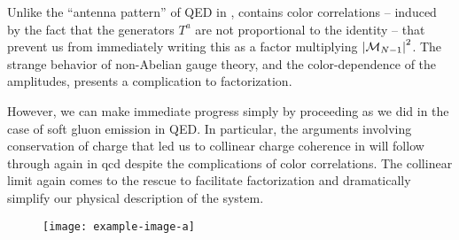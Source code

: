 Unlike the ``antenna pattern'' of QED in ,  contains color correlations -- induced by the fact that the generators \(T^a\) are not proportional to the identity -- that prevent us from immediately writing this as a factor multiplying \(\abs{\mathcal{M}_{N-1}}^2\).
%
The strange behavior of non-Abelian gauge theory, and the color-dependence of the amplitudes, presents a complication to factorization.

However, we can make immediate progress simply by proceeding as we did in the case of soft gluon emission in QED.
%
In particular, the arguments involving conservation of charge that led us to collinear charge coherence in  will follow through again in \gls{qcd} despite the complications of color correlations.
%
The collinear limit again comes to the rescue to facilitate factorization and dramatically simplify our physical description of the system.

\begin{figure}[]
    \centering
    \texttt{[image: example-image-a]}
    \caption[A cartoon depicting color coherence and angular ordering in QCD. ]
    {
    }
    \label{fig:qcd-coherent-branching}
\end{figure}


